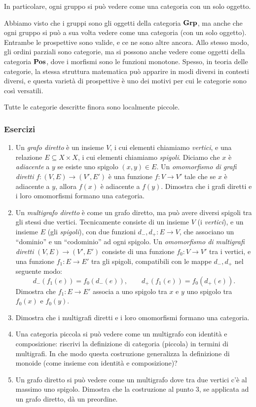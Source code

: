 In particolare, ogni gruppo si può vedere come una categoria con un solo oggetto. 

\begin{remark}
 Abbiamo visto che i gruppi sono gli oggetti della categoria $\mathbf{Grp}$, ma anche che ogni gruppo si può a sua volta vedere come una categoria (con un solo oggetto). Entrambe le prospettive sono valide, e ce ne sono altre ancora. 
 Allo stesso modo, gli ordini parziali sono categorie, ma si possono anche vedere come oggetti della categoria $\mathbf{Pos}$, dove i morfismi sono le funzioni monotone. 
 Spesso, in teoria delle categorie, la stessa struttura matematica può apparire in modi diversi in contesti diversi, e questa varietà di prospettive è uno dei motivi per cui le categorie sono così versatili. 
\end{remark}


Tutte le categorie descritte finora sono localmente piccole. 

\subsubsection*{Esercizi}
\begin{enumerate}
    \item Un \emph{grafo diretto} è un insieme $V$, i cui elementi chiamiamo \emph{vertici}, e una relazione $E\subseteq X\times X$, i cui elementi chiamiamo \emph{spigoli}. Diciamo che $x$ è \emph{adiacente} a $y$ se esiste uno spigolo $(x,y)\in E$. Un \emph{omomorfismo di grafi diretti} $f:(V,E)\to (V',E')$ è una funzione $f:V\to V'$ tale che se $x$ è adiacente a $y$, allora $f(x)$ è adiacente a $f(y)$. Dimostra che i grafi diretti e i loro omomorfismi formano una categoria. 
    \item Un \emph{multigrafo diretto} è come un grafo diretto, ma può avere diversi spigoli tra gli stessi due vertici. Tecnicamente consiste di un insieme $V$ (i \emph{vertici}), e un insieme $E$ (gli \emph{spigoli}), con due funzioni $d_-,d_+:E\to V$, che associano un ``dominio'' e un ``codominio'' ad ogni spigolo. Un \emph{omomorfismo di multigrafi diretti} $(V,E)\to (V',E')$ consiste di una funzione $f_0:V\to V'$ tra i vertici, e una funzione $f_1:E\to E'$ tra gli spigoli, compatibili con le mappe $d_-,d_+$ nel seguente modo:
    $$
    d_-(f_1(e)) = f_0(d_-(e)) ,\qquad d_+(f_1(e)) = f_0(d_+(e)) .
    $$
    Dimostra che $f_1:E\to E'$ associa a uno spigolo tra $x$ e $y$ uno spigolo tra $f_0(x)$ e $f_0(y)$. 
    \item Dimostra che i multigrafi diretti e i loro omomorfismi formano una categoria. 
    \item Una categoria piccola si può vedere come un multigrafo con identità e composizione: riscrivi la definizione di categoria (piccola) in termini di multigrafi.  In che modo questa costruzione generalizza la definizione di monoide (come insieme con identità e composizione)?
    \item Un grafo diretto si può vedere come un multigrafo dove tra due vertici c'è al massimo uno spigolo. Dimostra che la costruzione al punto 3, se applicata ad un grafo diretto, dà un preordine. 
\end{enumerate}


